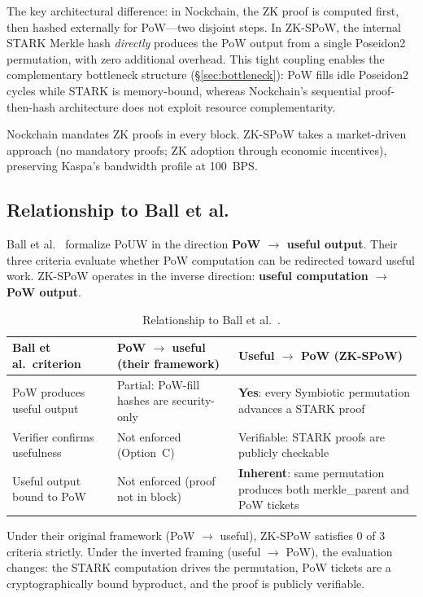 \documentclass[11pt,a4paper]{article}
\begin{document}
The key architectural difference: in Nockchain, the ZK proof is computed first, then hashed externally for PoW---two disjoint steps. In ZK-SPoW, the internal STARK Merkle hash \emph{directly} produces the PoW output from a single Poseidon2 permutation, with zero additional overhead. This tight coupling enables the complementary bottleneck structure (\S\ref{sec:bottleneck}): PoW fills idle Poseidon2 cycles while STARK is memory-bound, whereas Nockchain's sequential proof-then-hash architecture does not exploit resource complementarity.

Nockchain mandates ZK proofs in every block. ZK-SPoW takes a market-driven approach (no mandatory proofs; ZK adoption through economic incentives), preserving Kaspa's bandwidth profile at 100~BPS.

\subsection{Relationship to Ball et al.}

Ball et al.~\cite{ball2017} formalize PoUW in the direction \textbf{PoW $\to$ useful output}. Their three criteria evaluate whether PoW computation can be redirected toward useful work. ZK-SPoW operates in the inverse direction: \textbf{useful computation $\to$ PoW output}.

\begin{table}[h]
\centering
\small
\begin{tabular}{@{}lll@{}}
\toprule
Ball et al.\ criterion & PoW $\to$ useful (their framework) & Useful $\to$ PoW (ZK-SPoW) \\
\midrule
PoW produces useful output & Partial: PoW-fill hashes are security-only & \textbf{Yes}: every Symbiotic permutation advances a STARK proof \\
Verifier confirms usefulness & Not enforced (Option~C) & Verifiable: STARK proofs are publicly checkable \\
Useful output bound to PoW & Not enforced (proof not in block) & \textbf{Inherent}: same permutation produces both merkle\_parent and PoW tickets \\
\bottomrule
\end{tabular}
\caption{Relationship to Ball et al.~\cite{ball2017}.}
\label{tab:ball}
\end{table}

Under their original framework (PoW $\to$ useful), ZK-SPoW satisfies 0 of 3 criteria strictly. Under the inverted framing (useful $\to$ PoW), the evaluation changes: the STARK computation drives the permutation, PoW tickets are a cryptographically bound byproduct, and the proof is publicly verifiable.
\end{document}
